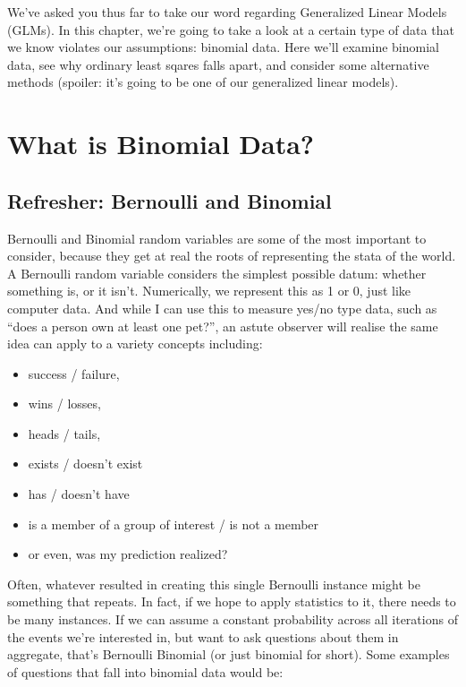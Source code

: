 \documentclass[
]{book}
\providecommand{\tightlist}{%
  \setlength{\itemsep}{0pt}\setlength{\parskip}{0pt}}
\begin{document}
We've asked you thus far to take our word regarding Generalized Linear Models (GLMs). In this chapter, we're going to take a look at a certain type of data that we know violates our assumptions: binomial data. Here we'll examine binomial data, see why ordinary least sqares falls apart, and consider some alternative methods (spoiler: it's going to be one of our generalized linear models).

\hypertarget{what-is-binomial-data}{%
\section{What is Binomial Data?}\label{what-is-binomial-data}}

\hypertarget{refresher-bernoulli-and-binomial}{%
\subsection{Refresher: Bernoulli and Binomial}\label{refresher-bernoulli-and-binomial}}

Bernoulli and Binomial random variables are some of the most important to consider, because they get at real the roots of representing the stata of the world. A Bernoulli random variable considers the simplest possible datum: whether something is, or it isn't. Numerically, we represent this as 1 or 0, just like computer data. And while I can use this to measure yes/no type data, such as ``does a person own at least one pet?'', an astute observer will realise the same idea can apply to a variety concepts including:

\begin{itemize}
\tightlist
\item
  success / failure,
\item
  wins / losses,
\item
  heads / tails,
\item
  exists / doesn't exist
\item
  has / doesn't have
\item
  is a member of a group of interest / is not a member
\item
  or even, was my prediction realized?
\end{itemize}

Often, whatever resulted in creating this single Bernoulli instance might be something that repeats. In fact, if we hope to apply statistics to it, there needs to be many instances. If we can assume a constant probability across all iterations of the events we're interested in, but want to ask questions about them in aggregate, that's Bernoulli Binomial (or just binomial for short). Some examples of questions that fall into binomial data would be:
\end{document}
